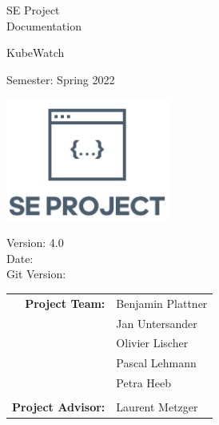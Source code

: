 \begin{titlepage}

    \begin{center}


        \vspace{1 cm}

        {\Large SE Project \\ Documentation} \\

        \vspace{0.5cm}

        {\Huge KubeWatch}

        \vspace{0.5cm}

        Semester: Spring 2022

        \vspace{0.5 cm}

        \includegraphics[height=4cm]{resources/se-project-logo.png}

        \vspace{0.5 cm}

        Version: 4.0 \\
        Date: \DTMnow \\
        Git Version: \gitDescription
        \vspace{1 cm}

        \begin{tabular}{rl}
            \textbf{Project Team:}    & Benjamin Plattner \\
                                      & Jan Untersander \\
                                      & Olivier Lischer \\
                                      & Pascal Lehmann \\
                                      & Petra Heeb \\
                                      &                    \\
            \textbf{Project Advisor:} & Laurent Metzger
        \end{tabular}


\end{center}
\end{titlepage}
